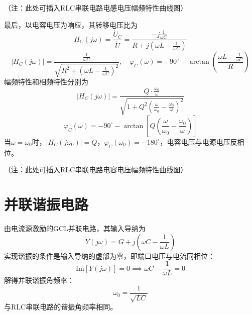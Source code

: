 （注：此处可插入RLC串联电路电感电压幅频特性曲线图）

最后，以电容电压为响应，其转移电压比为
\[
H_C(j\omega) = \frac{\dot{U}_C}{\dot{U}} = \frac{-j\frac{1}{\omega C}}{R + j\left(\omega L - \frac{1}{\omega C}\right)}
\]
\[
|H_C(j\omega)| = \frac{\frac{1}{\omega C}}{\sqrt{R^2 + \left(\omega L - \frac{1}{\omega C}\right)^2}}, \quad \varphi_C(\omega) = -90^\circ - \arctan\left(\frac{\omega L - \frac{1}{\omega C}}{R}\right)
\]
幅频特性和相频特性分别为
\[
|H_C(j\omega)| = \frac{Q \cdot \frac{\omega_0}{\omega}}{\sqrt{1 + Q^2\left(\frac{\omega}{\omega_0} - \frac{\omega_0}{\omega}\right)^2}}
\]
\[
\varphi_C(\omega) = -90^\circ - \arctan\left[Q\left(\frac{\omega}{\omega_0} - \frac{\omega_0}{\omega}\right)\right]
\]
当$\omega = \omega_0$时，$|H_C(j\omega_0)| = Q$，$\varphi_C(\omega_0) = -180^\circ$，电容电压与电源电压反相位。

（注：此处可插入RLC串联电路电容电压幅频特性曲线图）

\section{并联谐振电路}
由电流源激励的$\mathrm{GCL}$并联电路，其输入导纳为
\[
Y(j\omega) = G + j\left(\omega C - \frac{1}{\omega L}\right)
\]
实现谐振的条件是输入导纳的虚部为零，即端口电压与电流同相位：
\[
\mathrm{Im}[Y(j\omega)] = 0 \implies \omega C - \frac{1}{\omega L} = 0
\]
解得并联谐振角频率：
\[
\omega_0 = \frac{1}{\sqrt{LC}}
\]
与RLC串联电路的谐振角频率相同。